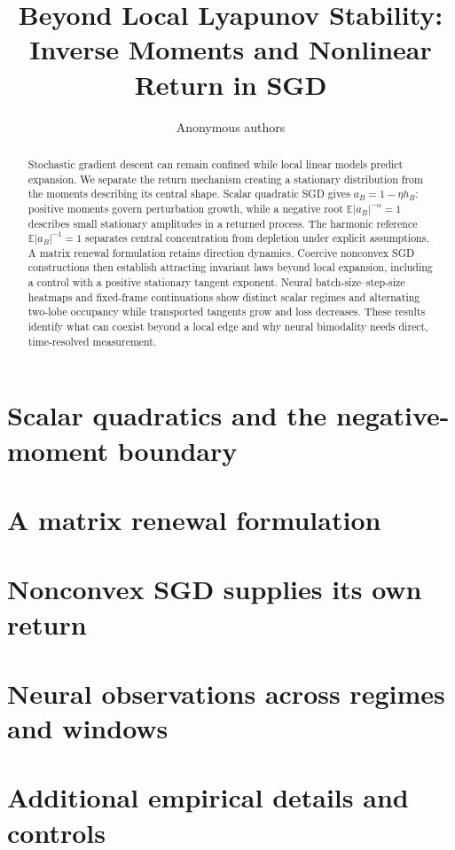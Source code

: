 \documentclass{article}
\title{Beyond Local Lyapunov Stability:\\Inverse Moments and Nonlinear Return in SGD}
\author{Anonymous authors}
\theoremstyle{definition}
\begin{document}
\maketitle
\begin{abstract}
Stochastic gradient descent can remain confined while local linear models predict expansion. We separate the return mechanism creating a stationary distribution from the moments describing its central shape. Scalar quadratic SGD gives $a_B=1-\eta h_B$: positive moments govern perturbation growth, while a negative root $\mathbb E|a_B|^{-\alpha}=1$ describes small stationary amplitudes in a returned process. The harmonic reference $\mathbb E|a_B|^{-1}=1$ separates central concentration from depletion under explicit assumptions. A matrix renewal formulation retains direction dynamics. Coercive nonconvex SGD constructions then establish attracting invariant laws beyond local expansion, including a control with a positive stationary tangent exponent. Neural batch-size--step-size heatmaps and fixed-frame continuations show distinct scalar regimes and alternating two-lobe occupancy while transported tangents grow and loss decreases. These results identify what can coexist beyond a local edge and why neural bimodality needs direct, time-resolved measurement.
\end{abstract}

\section{Scalar quadratics and the negative-moment boundary}


\section{A matrix renewal formulation}

\section{Nonconvex SGD supplies its own return}



\section{Neural observations across regimes and windows}

\clearpage

\label{main:lastpage}
\clearpage


\clearpage
\appendix




\section{Additional empirical details and controls}

\end{document}
